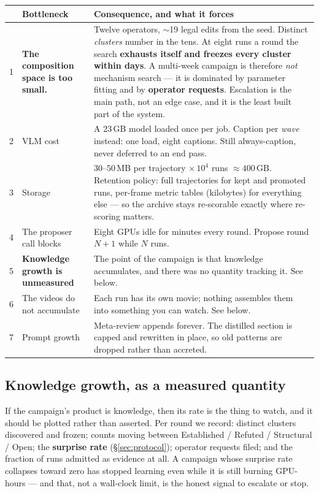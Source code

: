 \documentclass[11pt]{article}
\begin{document}
\begin{center}\small
\begin{tabular}{@{}p{0.4cm}p{4.0cm}p{9.4cm}@{}}
\toprule
 & \textbf{Bottleneck} & \textbf{Consequence, and what it forces} \\
\midrule
1 & \textbf{The composition space is too small.} & Twelve operators, $\sim$19 legal edits from
the seed. Distinct \emph{clusters} number in the tens. At eight runs a round the search
\textbf{exhausts itself and freezes every cluster within days}. A multi-week campaign is
therefore \emph{not} mechanism search --- it is dominated by parameter fitting and by
\textbf{operator requests}. Escalation is the main path, not an edge case, and it is the least
built part of the system. \\
2 & VLM cost & A $23\,$GB model loaded once per job. Caption per \emph{wave} instead: one load,
eight captions. Still always-caption, never deferred to an end pass. \\
3 & Storage & $30$--$50\,$MB per trajectory $\times\,10^4$ runs $\approx 400\,$GB. Retention
policy: full trajectories for kept and promoted runs, per-frame metric tables (kilobytes) for
everything else --- so the archive stays re-scorable exactly where re-scoring matters. \\
4 & The proposer call blocks & Eight GPUs idle for minutes every round. Propose round $N{+}1$
while $N$ runs. \\
5 & \textbf{Knowledge growth is unmeasured} & The point of the campaign is that knowledge
accumulates, and there was no quantity tracking it. See below. \\
6 & The videos do not accumulate & Each run has its own movie; nothing assembles them into
something you can watch. See below. \\
7 & Prompt growth & Meta-review appends forever. The distilled section is capped and rewritten
in place, so old patterns are dropped rather than accreted. \\
\bottomrule
\end{tabular}
\end{center}

\subsection{Knowledge growth, as a measured quantity}

If the campaign's product is knowledge, then its rate is the thing to watch, and it should be
plotted rather than asserted. Per round we record: distinct clusters discovered and frozen;
counts moving between Established / Refuted / Structural / Open; the \textbf{surprise rate}
(\S\ref{sec:protocol}); operator requests filed; and the fraction of runs admitted as evidence
at all. A campaign whose surprise rate collapses toward zero has stopped learning even while it
is still burning GPU-hours --- and that, not a wall-clock limit, is the honest signal to
escalate or stop.
\end{document}
